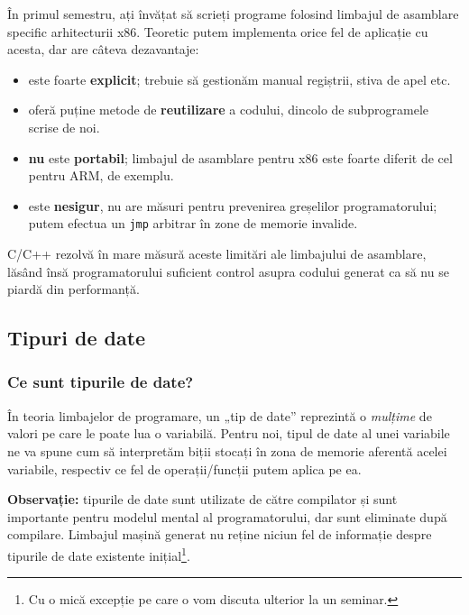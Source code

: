 În primul semestru, ați învățat să scrieți programe folosind limbajul de asamblare specific arhitecturii x86. Teoretic putem implementa orice fel de aplicație cu acesta, dar are câteva dezavantaje:
\begin{itemize}
    \item este foarte \textbf{explicit}; trebuie să gestionăm manual regiștrii, stiva de apel etc.
    
    \item oferă puține metode de \textbf{reutilizare} a codului, dincolo de subprogramele scrise de noi.
    
    \item \textbf{nu} este \textbf{portabil}; limbajul de asamblare pentru x86 este foarte diferit de cel pentru ARM, de exemplu.
    
    \item este \textbf{nesigur}, nu are măsuri pentru prevenirea greșelilor programatorului; putem efectua un \texttt{jmp} arbitrar în zone de memorie invalide.
\end{itemize}
C/C++ rezolvă în mare măsură aceste limitări ale limbajului de asamblare, lăsând însă programatorului suficient control asupra codului generat ca să nu se piardă din performanță.


\subsection*{Tipuri de date}

\subsubsection*{Ce sunt tipurile de date?}

În teoria limbajelor de programare, un „tip de date” reprezintă o \emph{mulțime} de valori pe care le poate lua o variabilă. Pentru noi, tipul de date al unei variabile ne va spune cum să interpretăm biții stocați în zona de memorie aferentă acelei variabile, respectiv ce fel de operații/funcții putem aplica pe ea.

\textbf{Observație:} tipurile de date sunt utilizate de către compilator și sunt importante pentru modelul mental al programatorului, dar sunt eliminate după compilare. Limbajul mașină generat nu reține niciun fel de informație despre tipurile de date existente inițial\footnote{Cu o mică excepție pe care o vom discuta ulterior la un seminar.}.

